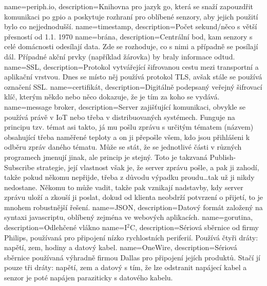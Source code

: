 {
  name={periph.io},
  description={Knihovna pro jazyk \gls{go}, která se snaží zapouzdřit komunikaci po \acrshort{gpio} a poskytuje rozhraní 
  pro oblíbené senzory, aby jejich použití bylo co nejjednodušší. \parencite{periphio}}
}
{
  name={timestamp},
  description={Počet sekund/něco s větší přesností od 1.1. 1970 \parencite{wiki:timestamp}}
}
{
  name={brána},
  description={Centrální bod, kam senzory s celé domácnosti odesílají data. Zde se rozhoduje, co s nimi a případně se 
  posílají dál. Případné akční prvky (například žárovka) by braly informace odtud. \parencite{wiki:gateway}}
}
{
  name={SSL},
  description={Protokol vytvářející šifrovanou cestu mezi transportní a aplikační vrstvou. Dnes se místo něj používá 
  protokol TLS, avšak stále se používá označení SSL. \parencite{wiki:ssl}}
}
{
  name={certifikát},
  description={Digitálně podepsaný veřejný šifrovací klíč, kterým někdo nebo něco dokazuje, že je tím za koho se vydává. 
  \parencite{wiki:certifikat}}
}
{
  name={message broker},
  description={Server zajišťující komunikaci, obvykle se používá právě v IoT nebo třeba v distribuovaných systémech. 
    Funguje na principu tzv. témat asi takto, já mu pošlu zprávu s určitým tématem (názvem) obsahující třeba naměřené 
    teploty a on ji přepošle všem, kdo jsou přihlášeni k odběru zpráv daného tématu. Může se stát, že se jednotlivé 
    části v různých programech jmenují jinak, ale princip je stejný. Toto je takzvaná Publish-Subscribe strategie, její 
    vlastnost však je, že server zprávu pošle, a pak ji zahodí, takže pokud někomu nepřijde, třeba z důvodu výpadku 
    proudu\ldots tak už ji nikdy nedostane. Někomu to může vadit, takže pak vznikají nadstavby, kdy server zprávu uloží 
    a zkouší ji poslat, dokud od klienta neobdrží potvrzení o přijetí, to je mnohem robustnější řešení. 
  \parencite{root.cz:NATS-streaming}}
}
{
  name={JSON},
  description={Datový formát založený na syntaxi javascriptu, oblíbený zejména ve webových aplikacích. 
  \parencite{wiki:json}}
}
{
  name={gorutina},
  description={Odlehčené vlákno \parencite{root.cz:gorutiny}}
}
{
  name={I$^2$C},
  description={Sériová sběrnice od firmy Philips, používaná pro připojení nízko rychlostních periferií. Používá čtyři 
  dráty: napětí, zem, hodiny a datový kabel. \parencite{wiki:twi}}
}
{
  name={OneWire},
  description={Sériová sběrnice používaná výhradně firmou Dallas pro připojení jejích produktů. Stačí jí pouze tři 
  dráty: napětí, zem a datový s tím, že lze odstranit napájecí kabel a senzor je poté napájen paraziticky s datového 
kabelu. \parencite{wiki:onewire}}
}
